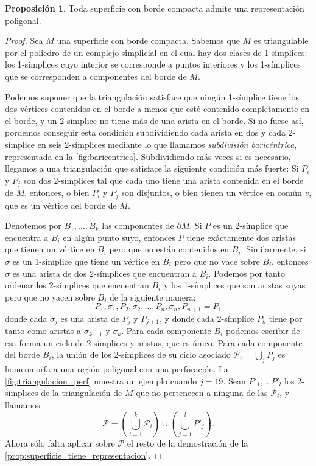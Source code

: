 \documentclass[10pt]{report}
\theoremstyle{definition}
\newtheorem{prop}[defin]{Proposición}
\begin{document}
\begin{prop}\label{prop:sup_borde_rep}
Toda superficie con borde compacta admite una representación poligonal.
\end{prop}
\begin{proof}
Sea $M$ una superficie con borde compacta. Sabemos que $M$ es triangulable por el poliedro de un complejo simplicial en el cual hay dos clases de 1-símplices: los 1-símplices cuyo interior se corresponde a puntos interiores y los 1-símplices que se corresponden a componentes del borde de $M$. 

Podemos suponer que la triangulación satisface que ningún 1-símplice tiene los dos vértices contenidos en el borde a menos que esté contenido completamente en el borde, y un 2-símplice no tiene más de una arista en el borde. Si no fuese así, pordemos conseguir esta condición subdividiendo cada arista en dos y cada 2-símplice en seis 2-símplices mediante lo que llamamos \textit{subdivisión baricéntrica}, representada en la \autoref{fig:baricentrica}. Subdividiendo más veces si es necesario, llegamos a una triangulación que satisface la siguiente condición más fuerte: Si $P_i$ y $P_j$ son  dos 2-símplices tal que cada uno tiene una arista contenida en el borde de $M$, entonces, o bien $P_i$ y $P_j$ son disjuntos, o bien tienen un vértice en común $v$, que es un vértice del borde de $M$.

Denotemos por $B_1,\dots , B_k$ las componentes de $\partial M$. Si $P$ es un 2-símplice que encuentra a $B_i$ en algún punto suyo, entonces $P$ tiene exáctamente dos aristas que tienen un vértice en $B_i$ pero que no están contenidos en $B_i$. Similarmente, si $\sigma$ es un 1-símplice que tiene un vértice en $B_i$ pero que no yace sobre $B_i$, entonces $\sigma$ es una arista de dos 2-símplices que encuentran a $B_i$. Podemos por tanto ordenar los 2-símplices que encuentran $B_i$ y los 1-símplices que son aristas suyas pero que no yacen sobre $B_i$ de la siguiente manera: 
\begin{equation*}
P_1,\sigma_1,P_2,\sigma_2,\dots ,P_n,\sigma_n,P_{n+1}=P_1
\end{equation*}
donde cada $\sigma_j$ es una arista de $P_j$ y $P_{j+1}$, y donde cada 2-símplice $P_k$ tiene por tanto como aristas a $\sigma_{k-1}$ y $\sigma_k$. Para cada componente $B_i$ podemos escribir de esa forma un ciclo de 2-símplices y aristas, que es único. Para cada componente del borde $B_i$, la unión de los 2-símplices de su ciclo asociado $\mathcal{P}_i=\bigcup_{j}P_j$ es homeomorfa a una región poligonal con una perforación. La \autoref{fig:triangulacion_perf} muestra un ejemplo cuando $j=19$. Sean $P'_1,\dots P'_l$ los 2-símplices de la triangulación de $M$ que no pertenecen a ninguna de las $\mathcal{P}_i$, y llamamos $$\mathcal{P}=\left( \bigcup_{i=1}^{k} \mathcal{P}_i\right) \cup \left( \bigcup_{j=1}^{l} P'_j\right).$$
Ahora sólo falta aplicar sobre $\mathcal{P}$ el resto de la demostración de la \autoref{prop:superficie_tiene_representacion}.
\end{proof}
\end{document}
